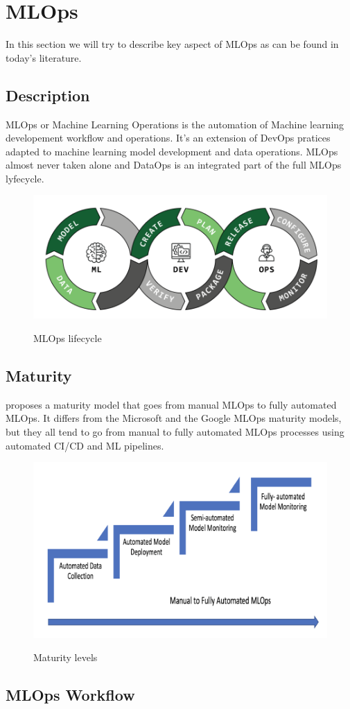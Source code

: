 \section{MLOps}\label{sec:mlops}

In this section we will try to describe key aspect of MLOps as can be found in today's literature.

\subsection{Description}
MLOps or Machine Learning Operations is the automation of Machine learning developement workflow and operations.
It's an extension of DevOps pratices adapted to machine learning model development and data operations.
MLOps almost never taken alone and DataOps is an integrated part of the full MLOps lyfecycle.

\begin{figure}[!htbp]
    \caption{MLOps lifecycle\cite{mlops-definition-tools-and-challenge}}
    \centering
    \includegraphics[scale=0.5]{images/ml-dev-ops}
    \label{fig:ml-dev-ops}
\end{figure}

\subsection{Maturity}
\cite{mlops-maturity-model} proposes a maturity model that goes from manual MLOps to fully automated MLOps.
It differs from the Microsoft and the Google MLOps maturity models,
but they all tend to go from manual to fully automated MLOps processes using automated CI/CD and
ML pipelines.\cite{mlops-definition-tools-and-challenge}

\begin{figure}[!htbp]
    \caption{Maturity levels \cite{mlops-maturity-model}}
    \centering
    \includegraphics[scale=0.5]{images/maturity-levels}
    \label{fig:maturity}
\end{figure}

\subsection{MLOps Workflow}
